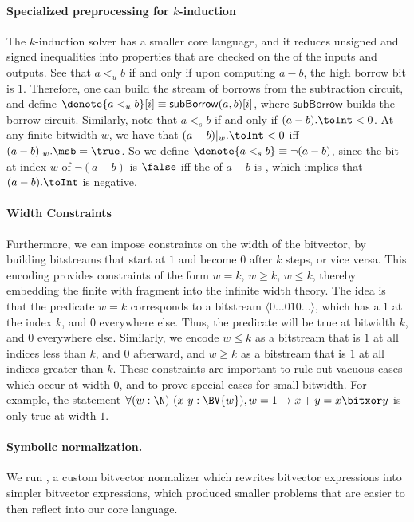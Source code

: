 \paragraph{Specialized preprocessing for $k$-induction}
The $k$-induction solver has a smaller core language, and it reduces unsigned and signed inequalities
into properties that are checked on the \msb{} of the inputs and outputs.
See that $a <_u b$ if and only if upon computing $a - b$, the high borrow bit
is $1$. Therefore, one can build the stream of borrows from the subtraction circuit,
and define $\denote{a <_u b}[i] \equiv \mathsf{subBorrow}(a, b)[i]$, where $\mathsf{subBorrow}$
builds the borrow circuit. Similarly, note that $a <_s b$ if and only if $(a - b).\toInt < 0$.
At any finite bitwidth $w$, we have that $(a - b)|_w.\toInt < 0$ iff $(a - b)|_w.\msb = \true$.
So we define $\denote{a <_s b} \equiv \lnot (a - b)$, since the bit at index $w$  of $\lnot (a - b)$ is $\false$
iff the \msb of $a - b$ is \true, which implies that $(a - b).\toInt$ is negative.

\paragraph{Width Constraints}
Furthermore, we can impose constraints on the width of the bitvector,
by building bitstreams that start at $1$ and become $0$ after $k$ steps, or vice versa.
This encoding provides constraints of the form $w = k$, $w \geq k$, $w \leq k$,
thereby embedding the finite with fragment into the infinite width theory.
The idea is that the predicate $w = k$ corresponds to a bitstream $\langle0\dots010\dots\rangle$,
which has a $1$ at the index $k$, and $0$ everywhere else. Thus, the predicate
will be true at bitwidth $k$, and $0$ everywhere else.
Similarly, we encode $w \leq k$ as a bitstream that is $1$ at all indices less than $k$,
and $0$ afterward, and $w \geq k$ as a bitstream that is $1$ at all indices greater than $k$.
These constraints are important to rule out vacuous cases which occur at width $0$,
and to prove special cases for small bitwidth.
For example, the statement $\forall (w : \N)~(x~y : \BV{w}), w = 1 \to x + y = x \bitxor y$
is only true at width $1$.

\paragraph{Symbolic normalization.} We run \bvnormalize{}, a custom bitvector
normalizer which rewrites bitvector expressions into simpler bitvector expressions,
which produced smaller problems that are easier to then reflect into our core language.

